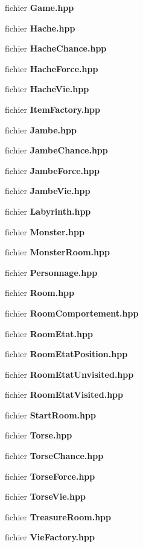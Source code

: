 \begin{DoxyCompactItemize}
fichier {\bf Game.\-hpp}
\item 
fichier {\bf Hache.\-hpp}
\item 
fichier {\bf Hache\-Chance.\-hpp}
\item 
fichier {\bf Hache\-Force.\-hpp}
\item 
fichier {\bf Hache\-Vie.\-hpp}
\item 
fichier {\bf Item\-Factory.\-hpp}
\item 
fichier {\bf Jambe.\-hpp}
\item 
fichier {\bf Jambe\-Chance.\-hpp}
\item 
fichier {\bf Jambe\-Force.\-hpp}
\item 
fichier {\bf Jambe\-Vie.\-hpp}
\item 
fichier {\bf Labyrinth.\-hpp}
\item 
fichier {\bf Monster.\-hpp}
\item 
fichier {\bf Monster\-Room.\-hpp}
\item 
fichier {\bf Personnage.\-hpp}
\item 
fichier {\bf Room.\-hpp}
\item 
fichier {\bf Room\-Comportement.\-hpp}
\item 
fichier {\bf Room\-Etat.\-hpp}
\item 
fichier {\bf Room\-Etat\-Position.\-hpp}
\item 
fichier {\bf Room\-Etat\-Unvisited.\-hpp}
\item 
fichier {\bf Room\-Etat\-Visited.\-hpp}
\item 
fichier {\bf Start\-Room.\-hpp}
\item 
fichier {\bf Torse.\-hpp}
\item 
fichier {\bf Torse\-Chance.\-hpp}
\item 
fichier {\bf Torse\-Force.\-hpp}
\item 
fichier {\bf Torse\-Vie.\-hpp}
\item 
fichier {\bf Treasure\-Room.\-hpp}
\item 
fichier {\bf Vie\-Factory.\-hpp}
\end{DoxyCompactItemize}

